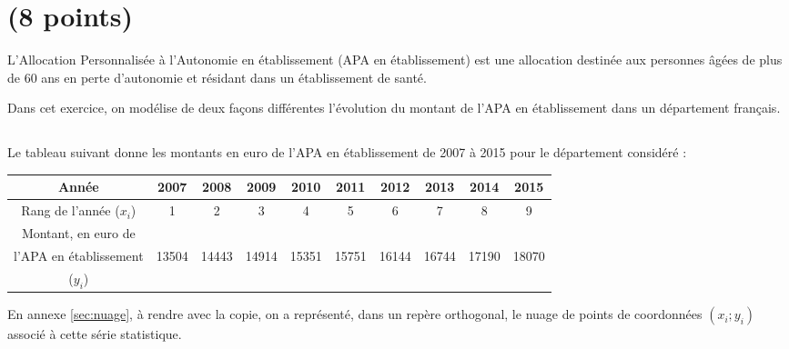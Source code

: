 \section{(8 points)}\label{ex:apa}

L'Allocation Personnalisée à l'Autonomie en établissement (APA en établissement) est une allocation destinée aux personnes âgées de plus de 60 ans en perte d'autonomie et résidant dans un établissement de santé.


Dans cet exercice, on modélise de deux façons différentes l'évolution du montant de l'APA en établissement dans un département français.

\subsection{}

Le tableau suivant donne les montants en euro de l'APA en établissement de 2007 à 2015 pour le département considéré :

\begin{table}[h!]
	{\small \begin{tabular}{|@{\ }c@{\ }|@{\ }c@{\ }|@{\ }c@{\ }|@{\ }c@{\ }|@{\ }c@{\ }|@{\ }c@{\ }|@{\ }c@{\ }|@{\ }c@{\ }|@{\ }c@{\ }|@{\ }c@{\ }|}
	\hline
	Année                   & 2007        & 2008        & 2009        & 2010        & 2011        & 2012        & 2013        & 2014        & 2015        \\ \hline
	Rang de l'année ($x_i$) & 1           & 2           & 3           & 4           & 5           & 6           & 7           & 8           & 9           \\ \hline
	Montant, en euro de     &             &             &             &             &             &             &             &             &             \\ 
	l'APA en établissement  & \num{13504} & \num{14443} & \num{14914} & \num{15351} & \num{15751} & \num{16144} & \num{16744} & \num{17190} & \num{18070} \\ 
	($y_i$)                 &             &             &             &             &             &             &             &             &             \\ \hline
\end{tabular}}

\end{table}
En annexe \ref{sec:nuage}, à rendre avec la copie, on a représenté, dans un repère orthogonal, le nuage de points de coordonnées $(x_i ; y_i)$ associé à cette série statistique.

